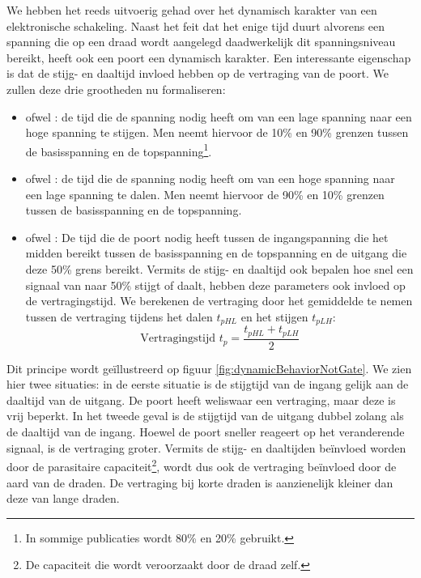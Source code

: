 We hebben het reeds uitvoerig gehad over het dynamisch karakter van een elektronische schakeling. Naast het feit dat het enige tijd duurt alvorens een spanning die op een draad wordt aangelegd daadwerkelijk dit spanningsniveau bereikt, heeft ook een poort een dynamisch karakter. Een interessante eigenschap is dat de stijg- en daaltijd invloed hebben op de vertraging van de poort. We zullen deze drie grootheden nu formaliseren:
\begin{itemize}
 \item {} ofwel : de tijd die de spanning nodig heeft om van een lage spanning naar een hoge spanning te stijgen. Men neemt hiervoor de 10\% en 90\% grenzen tussen de basisspanning en de topspanning\footnote{In sommige publicaties wordt 80\% en 20\% gebruikt.}.
 \item {} ofwel : de tijd die de spanning nodig heeft om van een hoge spanning naar een lage spanning te dalen. Men neemt hiervoor de 90\% en 10\% grenzen tussen de basisspanning en de topspanning.
 \item {} ofwel : De tijd die de poort nodig heeft tussen de ingangspanning die het midden bereikt tussen de basisspanning en de topspanning en de uitgang die deze 50\% grens bereikt. Vermits de stijg- en daaltijd ook bepalen hoe snel een signaal van naar 50\% stijgt of daalt, hebben deze parameters ook invloed op de vertragingstijd. We berekenen de vertraging door het gemiddelde te nemen tussen de vertraging tijdens het dalen $t_{pHL}$ en het stijgen $t_{pLH}$:
\begin{equation}
\mbox{Vertragingstijd $t_p$}=\displaystyle\frac{t_{pHL}+t_{pLH}}{2}
\end{equation}
\end{itemize}
Dit principe wordt ge\"illustreerd op figuur \ref{fig:dynamicBehaviorNotGate}. We zien hier twee situaties: in de eerste situatie is de stijgtijd van de ingang gelijk aan de daaltijd van de uitgang. De poort heeft weliswaar een vertraging, maar deze is vrij beperkt. In het tweede geval is de stijgtijd van de uitgang dubbel zolang als de daaltijd van de ingang. Hoewel de poort sneller reageert op het veranderende signaal, is de vertraging groter. Vermits de stijg- en daaltijden be\"invloed worden door de parasitaire capaciteit\footnote{De capaciteit die wordt veroorzaakt door de draad zelf.}, wordt dus ook de vertraging be\"invloed door de aard van de draden. De vertraging bij korte draden is aanzienelijk kleiner dan deze van lange draden.
